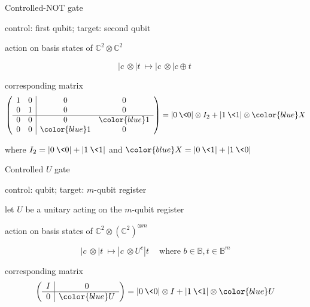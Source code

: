 \begin{frame}{Controlled-NOT gate}

control: first qubit; \quad target: second qubit\quad
{}

\bigskip
action on basis states of $\mathbb{C}^2\otimes\mathbb{C}^2$

\[
	|c\> \otimes |t\> \mapsto |c\> \otimes |c\oplus t\>
\]

\bigskip
corresponding matrix
\[
\left(
\begin{array}{cc|cc}
1      & 0      & 0      & 0 \\
0      & 1      & 0      & 0 \\ \hline
0      & 0      & 0      & {\color{blue}1} \\
0      & 0      & {\color{blue}1}      & 0
\end{array}
\right)
=
|0\>\<0| \otimes I_2 + |1\>\<1| \otimes {\color{blue} X}
\]

\medskip
where $I_2 = |0\>\<0|+|1\>\<1|$ and ${\color{blue}X=|0\>\<1| + |1\>\<0|}$
\end{frame}




\begin{frame}{Controlled $U$ gate}

control: qubit; \quad target: $m$-qubit register
\quad{}

\bigskip
let $U$ be a unitary acting on the $m$-qubit register

\bigskip
action on basis states of $\mathbb{C}^2\otimes(\mathbb{C}^2)^{\otimes m}$

\[
	|c\> \otimes |t\> \mapsto |c\> \otimes U^c |t\> \quad \mbox{where } b\in\mathbb{B}, t\in\mathbb{B}^m
\]

\bigskip
corresponding matrix
\[
\left(
\begin{array}{c|c}
I & 0 \\ \hline
0 & {\color{blue}U} 
\end{array}
\right)
=
|0\>\<0| \otimes I + |1\>\<1| \otimes {\color{blue}U}
\]

\end{frame}


